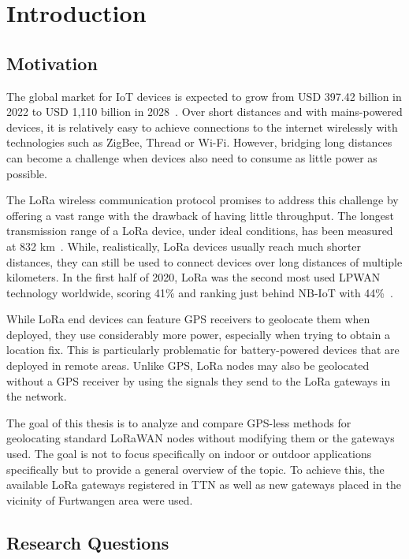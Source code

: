 \chapter{Introduction}

\section{Motivation}

The global market for \ac{IoT} devices is expected to grow from USD 397.42 billion in 2022 to USD 1,110 billion in 2028~\cite{lionel_sujay_vailshery_global_2022}.
Over short distances and with mains-powered devices, it is relatively easy to achieve connections to the internet wirelessly with technologies such as ZigBee, Thread or Wi-Fi.
However, bridging long distances can become a challenge when devices also need to consume as little power as possible.

The \ac{LoRa} wireless communication protocol promises to address this challenge by offering a vast range with the drawback of having little throughput.
The longest transmission range of a \ac{LoRa} device, under ideal conditions, has been measured at 832 km~\cite{the_things_network_global_team_lora_nodate}.
While, realistically, \ac{LoRa} devices usually reach much shorter distances, they can still be used to connect devices over long distances of multiple kilometers.
In the first half of 2020, \ac{LoRa} was the second most used \ac{LPWAN} technology worldwide, scoring 41\% and ranking just behind NB-IoT with 44\%~\cite{iot_analytics_lpwa_2020}.

While \ac{LoRa} end devices can feature \ac{GPS} receivers to geolocate them when deployed, they use considerably more power, especially when trying to obtain a location fix.
This is particularly problematic for battery-powered devices that are deployed in remote areas.
Unlike \ac{GPS}, \ac{LoRa} nodes may also be geolocated without a \ac{GPS} receiver by using the signals they send to the \ac{LoRa} gateways in the network.

The goal of this thesis is to analyze and compare \ac{GPS}-less methods for geolocating standard \ac{LoRaWAN} nodes without modifying them or the gateways used.
The goal is not to focus specifically on indoor or outdoor applications specifically but to provide a general overview of the topic.
To achieve this, the available \ac{LoRa} gateways registered in \acf{TTN} as well as new gateways placed in the vicinity of Furtwangen area were used.

\section{Research Questions}

